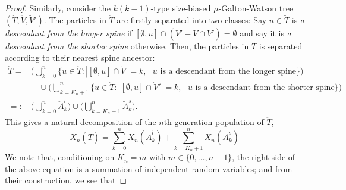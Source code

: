 \documentclass[12pt,a4paper]{amsart}
\numberwithin{equation}{section}
\begin{document}
\begin{proof}
	Similarly, consider the $k(k-1)$-type size-biased $\mu$-Galton-Watson tree $(\ddot T,\ddot V,\ddot V')$.
	The particles in $\ddot T$ are firstly separated into two classes: Say $u \in \ddot T$ is \emph{a descendant from the longer spine} if $[\emptyset , u] \cap (\ddot V' - \ddot V \cap \ddot V') = \emptyset$ and say it is \emph{a descendant from the shorter spine} otherwise.
	Then, the particles in $\ddot T$ is separated according to their nearest spine ancestor:
\begin{equation*}\begin{split}
	\ddot T
	=&\Big( \bigcup_{k=0}^n \{u\in\ddot T: | [\emptyset, u]\cap \ddot V | = k, \text{ $u$ is a descendant from the longer spine}\} \Big)
	\\&\quad \cup \Big( \bigcup_{k= K_n+1}^n \{u\in\ddot T: | [\emptyset, u]\cap \ddot V' | = k, \text{ $u$ is a descendant from the shorter spine}\}  \Big)
	\\=:& 	\Big ( \bigcup_{k=0}^n \ddot A^l_k\Big)  \cup \Big( \bigcup_{k=K_n+1}^n \ddot A^s_k \Big).
\end{split}\end{equation*}
	This gives a natural decomposition of the $n$th generation population of $\ddot T$,
\begin{equation}\label{eq:rawtwospinedecomposition}
		X_n(\ddot T)
	=
		\sum_{k=0}^nX_n(\ddot A^l_k) + \sum_{k=K_n + 1}^n X_n(\ddot A^s_k)
\end{equation}
	We note that, conditioning on $K_n = m$ with $m\in\{0,\dots,n-1\}$, the right side of the above equation is a summation of independent random variables; and from their construction, we see that

\end{proof}
\end{document}
